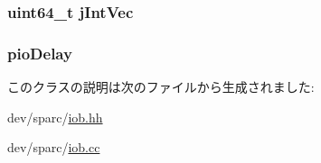 \label{classIob_a971401f936f065a7781d41a2cf198303}
\hypertarget{classIob_a46f4284ddac54035615f6ae5dd274949}{
\subsubsection[{jIntVec}]{\setlength{\rightskip}{0pt plus 5cm}uint64\_\-t {\bf jIntVec}}}
\label{classIob_a46f4284ddac54035615f6ae5dd274949}
\hypertarget{classIob_ac8e969635a78ab9ab123904ccca434cc}{
\subsubsection[{pioDelay}]{ {\bf pioDelay}}}
\label{classIob_ac8e969635a78ab9ab123904ccca434cc}


このクラスの説明は次のファイルから生成されました:\begin{DoxyCompactItemize}
\item 
dev/sparc/\hyperlink{iob_8hh}{iob.hh}\item 
dev/sparc/\hyperlink{iob_8cc}{iob.cc}\end{DoxyCompactItemize}
